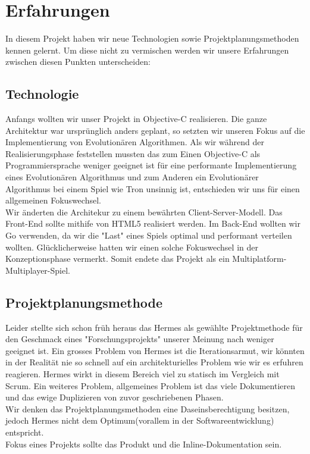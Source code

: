 \section{Erfahrungen}
In diesem Projekt haben wir neue Technologien sowie Projektplanungsmethoden kennen gelernt. Um diese nicht zu vermischen werden wir unsere Erfahrungen zwischen diesen Punkten unterscheiden: 
\subsection{Technologie}
Anfangs wollten wir unser Projekt in Objective-C realisieren. 
Die ganze Architektur war ursprünglich anders geplant, so setzten wir unseren Fokus auf die Implementierung von Evolutionären Algorithmen. 
Als wir während der Realisierungsphase feststellen mussten das zum Einen Objective-C als Programmiersprache weniger geeignet ist 
für eine performante Implementierung eines Evolutionären Algorithmus und zum Anderen ein Evolutionärer Algorithmus bei 
einem Spiel wie Tron unsinnig ist, entschieden wir uns für einen allgemeinen Fokuswechsel.
\\
Wir änderten die Architekur zu einem bewährten Client-Server-Modell. Das Front-End sollte mithife von HTML5 realisiert werden. Im Back-End
wollten wir Go verwenden, da wir die "{}Last"{} eines Spiels optimal und performant verteilen wollten. Glücklicherweise hatten wir einen solche Fokuswechsel in
der Konzeptionsphase vermerkt. Somit endete das Projekt als ein Multiplatform-Multiplayer-Spiel.

\subsection{Projektplanungsmethode}
Leider stellte sich schon früh heraus das Hermes als gewählte Projektmethode für den Geschmack eines "{}Forschungsprojekts"{} unserer Meinung nach 
weniger geeignet ist. Ein grosses Problem von Hermes ist die Iterationsarmut, wir könnten in der Realität nie so schnell auf ein architekturielles Problem wie wir es
erfuhren reagieren. Hermes wirkt in diesem Bereich viel zu statisch im Vergleich mit Scrum. Ein weiteres Problem, allgemeines Problem ist das viele Dokumentieren und das
ewige Duplizieren von zuvor geschriebenen Phasen.
\\
Wir denken das Projektplanungsmethoden eine Daseinsberechtigung besitzen, jedoch Hermes nicht dem Optimum(vorallem in der Softwareentwicklung) entspricht.
\\
Fokus eines Projekts sollte das Produkt und die Inline-Dokumentation sein. 
